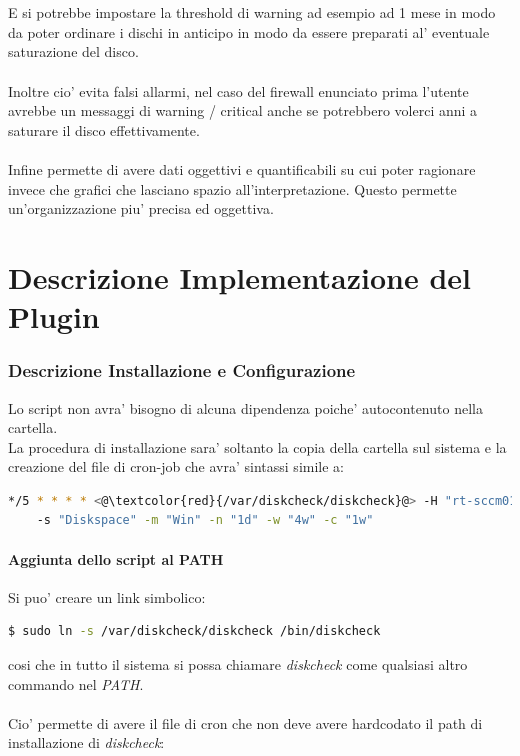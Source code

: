 \documentclass{article}
\begin{document}
\\\\
E si potrebbe impostare la threshold di warning ad esempio ad 1 mese in modo da poter ordinare i dischi in anticipo in modo da essere preparati al' eventuale saturazione del disco.
\\\\
Inoltre cio' evita falsi allarmi, nel caso del firewall enunciato prima l'utente avrebbe un messaggi di warning / critical anche se potrebbero volerci anni a saturare il disco effettivamente.
\\\\
Infine permette di avere dati oggettivi e quantificabili su cui poter ragionare invece che grafici che lasciano spazio all'interpretazione.
Questo permette un'organizzazione piu' precisa ed oggettiva.


\clearpage

\part*{Descrizione Implementazione del Plugin}

\section*{Descrizione Installazione e Configurazione}
Lo script non avra' bisogno di alcuna dipendenza poiche' autocontenuto nella cartella.\\
La procedura di installazione sara' soltanto la copia della cartella sul sistema e la creazione del file di cron-job che avra' sintassi simile a:

\begin{lstlisting}[language=Bash]
*/5 * * * * <@\textcolor{red}{/var/diskcheck/diskcheck}@> -H "rt-sccm01-p1.idolrt.regione.toscana.it"
    -s "Diskspace" -m "Win" -n "1d" -w "4w" -c "1w"
\end{lstlisting}

\subsection*{Aggiunta dello script al PATH}
Si puo' creare un link simbolico:
\begin{lstlisting}[language=Bash]
$ sudo ln -s /var/diskcheck/diskcheck /bin/diskcheck
\end{lstlisting}

cosi che in tutto il sistema si possa chiamare \textit{diskcheck} come qualsiasi altro commando nel \textit{PATH}.
\\\\
Cio' permette di avere il file di cron che non deve avere hardcodato il path di installazione di \textit{diskcheck}:
\end{document}
